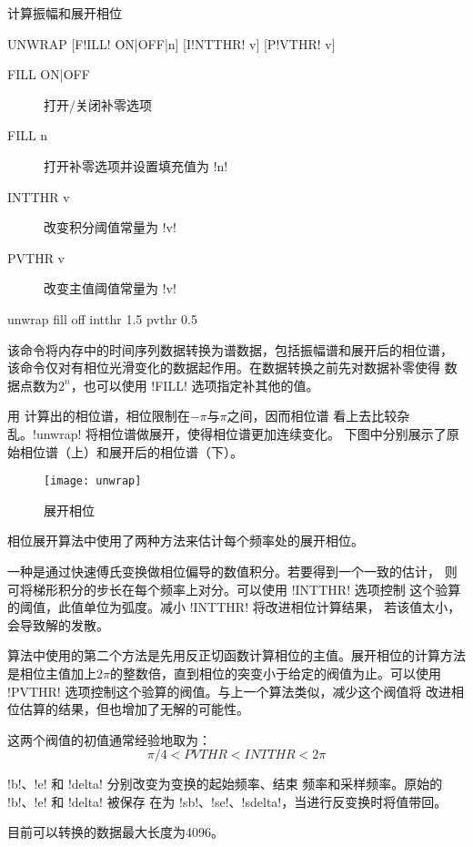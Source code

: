 \label{cmd:unwrap}

计算振幅和展开相位

\begin{SACSTX}
UNWRAP [F!ILL! ON|OFF|n] [I!NTTHR! v] [P!VTHR! v]
\end{SACSTX}

\begin{description}
\item [FILL ON|OFF] 打开/关闭补零选项
\item [FILL n] 打开补零选项并设置填充值为 !n!
\item [INTTHR v] 改变积分阈值常量为 !v!
\item [PVTHR v] 改变主值阈值常量为 !v!
\end{description}

\begin{SACDFT}
unwrap fill off intthr 1.5 pvthr 0.5
\end{SACDFT}

该命令将内存中的时间序列数据转换为谱数据，包括振幅谱和展开后的相位谱，
该命令仅对有相位光滑变化的数据起作用。在数据转换之前先对数据补零使得
数据点数为$2^n$，也可以使用 !FILL! 选项指定补其他的值。

用  计算出的相位谱，相位限制在$-\pi$与$\pi$之间，因而相位谱
看上去比较杂乱。!unwrap! 将相位谱做展开，使得相位谱更加连续变化。
下图中分别展示了原始相位谱（上）和展开后的相位谱（下）。

\begin{figure}[H]
\centering
\texttt{[image: unwrap]}
\caption{展开相位}
\end{figure}

相位展开算法中使用了两种方法来估计每个频率处的展开相位。

一种是通过快速傅氏变换做相位偏导的数值积分。若要得到一个一致的估计，
则可将梯形积分的步长在每个频率上对分。可以使用 !INTTHR! 选项控制
这个验算的阈值，此值单位为弧度。减小 !INTTHR! 将改进相位计算结果，
若该值太小，会导致解的发散。

算法中使用的第二个方法是先用反正切函数计算相位的主值。展开相位的计算方法
是相位主值加上$2\pi$的整数倍，直到相位的突变小于给定的阀值为止。可以使用
!PVTHR! 选项控制这个验算的阀值。与上一个算法类似，减少这个阀值将
改进相位估算的结果，但也增加了无解的可能性。

这两个阀值的初值通常经验地取为：
\[ \pi/4 < PVTHR < INTTHR < 2\pi \]

!b!、!e! 和 !delta! 分别改变为变换的起始频率、结束
频率和采样频率。原始的 !b!、!e! 和 !delta! 被保存
在为 !sb!、!se!、!sdelta!，当进行反变换时将值带回。

目前可以转换的数据最大长度为4096。

